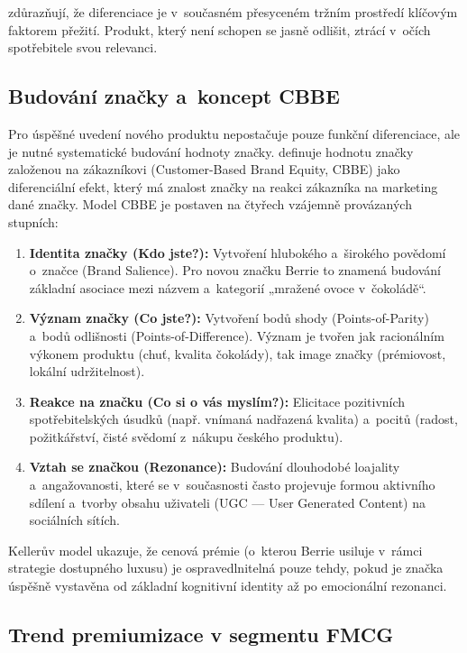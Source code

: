 \textcite{trout_rivkin_2008} zdůrazňují, že diferenciace je v~současném přesyceném tržním prostředí klíčovým faktorem přežití. Produkt, který není schopen se jasně odlišit, ztrácí v~očích spotřebitele svou relevanci.

\subsection{Budování značky a~koncept CBBE}
\label{subsec:theory_cbbe}

Pro úspěšné uvedení nového produktu nepostačuje pouze funkční diferenciace, ale je nutné systematické budování hodnoty značky. \textcite{keller_2012} definuje hodnotu značky založenou na zákazníkovi (Customer-Based Brand Equity, CBBE) jako diferenciální efekt, který má znalost značky na reakci zákazníka na marketing dané značky. Model CBBE je postaven na čtyřech vzájemně provázaných stupních:

\begin{enumerate}
  \item \textbf{Identita značky (Kdo jste?):} Vytvoření hlubokého a~širokého povědomí o~značce (Brand Salience). Pro novou značku Berrie to znamená budování základní asociace mezi názvem a~kategorií „mražené ovoce v~čokoládě“.
  \item \textbf{Význam značky (Co jste?):} Vytvoření bodů shody (Points-of-Parity) a~bodů odlišnosti (Points-of-Difference). Význam je tvořen jak racionálním výkonem produktu (chuť, kvalita čokolády), tak image značky (prémiovost, lokální udržitelnost).
  \item \textbf{Reakce na značku (Co si o vás myslím?):} Elicitace pozitivních spotřebitelských úsudků (např. vnímaná nadřazená kvalita) a~pocitů (radost, požitkářství, čisté svědomí z~nákupu českého produktu).
  \item \textbf{Vztah se značkou (Rezonance):} Budování dlouhodobé loajality a~angažovanosti, které se v~současnosti často projevuje formou aktivního sdílení a~tvorby obsahu uživateli (UGC — User Generated Content) na sociálních sítích.
\end{enumerate}

Kellerův model ukazuje, že cenová prémie (o~kterou Berrie usiluje v~rámci strategie dostupného luxusu) je ospravedlnitelná pouze tehdy, pokud je značka úspěšně vystavěna od základní kognitivní identity až po emocionální rezonanci.

\subsection{Trend premiumizace v segmentu FMCG}
\label{subsec:theory_premiumization}


